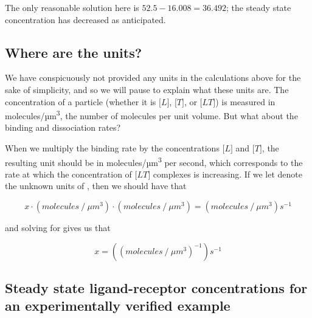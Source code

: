 The only reasonable solution here is $52.5-16.008 = 36.492$; the steady state concentration has decreased as anticipated.\\

\begin{qbox}\end{qbox}

\FloatBarrier
{}
\subsection{Where are the units?}

We have conspicuously not provided any units in the calculations above for the sake of simplicity, and so we will pause to explain what these units are. The concentration of a particle (whether it is $\text{[}L\text{]}$, $\text{[}T\text{]}$, or $\text{[}LT\text{]}$) is measured in molecules/µm\textsuperscript{3}, the number of molecules per unit volume. But what about the binding and dissociation rates?

When we multiply the binding rate  by the concentrations $\text{[}L\text{]}$ and $\text{[}T\text{]}$, the resulting unit should be in molecules/µm\textsuperscript{3} per second, which corresponds to the rate at which the concentration of $\text{[}LT\text{]}$ complexes is increasing. If we let  denote the unknown units of , then we should have that

$$x \cdot (molecules\mathbin{/}\mu m^3) \cdot (molecules\mathbin{/}\mu m^3) = (molecules\mathbin{/}\mu m^3)s^{-1}$$

and solving for  gives us that

$$x = ((molecules\mathbin{/}\mu m^3)^{-1})s^{-1}$$

\begin{qbox}\end{qbox}

\FloatBarrier
{}
\subsection{Steady state ligand-receptor concentrations for an experimentally verified example}

